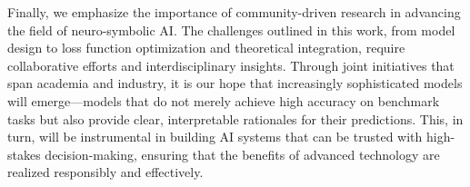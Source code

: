 \documentclass[12pt]{article}
\begin{document}
Finally, we emphasize the importance of community-driven research in advancing the field of neuro-symbolic AI. The challenges outlined in this work, from model design to loss function optimization and theoretical integration, require collaborative efforts and interdisciplinary insights. Through joint initiatives that span academia and industry, it is our hope that increasingly sophisticated models will emerge—models that do not merely achieve high accuracy on benchmark tasks but also provide clear, interpretable rationales for their predictions. This, in turn, will be instrumental in building AI systems that can be trusted with high-stakes decision-making, ensuring that the benefits of advanced technology are realized responsibly and effectively.
  
\end{document}
